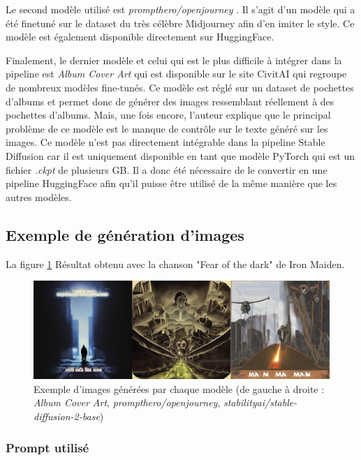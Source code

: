 Le second modèle utilisé est \textit{prompthero/openjourney} \cite{prompthero/openjourney}. 
Il s'agit d'un modèle qui a été finetuné sur le dataset du très célèbre Midjourney \cite{midjourney} afin d'en imiter le style.
Ce modèle est également disponible directement sur HuggingFace.

Finalement, le dernier modèle et celui qui est le plus difficile à intégrer dans la pipeline est
\textit{Album Cover Art} qui est disponible sur le site CivitAI \cite{civit-ai} qui regroupe de nombreux modèles fine-tunés.
Ce modèle est réglé sur un dataset de pochettes d'albums et permet donc de générer des images ressemblant réellement à des pochettes d'albums. Mais, une fois encore, l'auteur explique que le principal problème de ce modèle est le manque de contrôle sur le texte généré sur les images. Ce modèle n'est pas directement intégrable dans la pipeline Stable Diffusion car il est uniquement disponible en tant que modèle PyTorch qui est un fichier \textit{.ckpt} de plusieurs GB. Il a donc été nécessaire de le convertir en une pipeline HuggingFace afin qu'il puisse être utilisé de la même manière que les autres modèles.

\subsection{Exemple de génération d'images}
La figure \ref{fig:generation_result} Résultat obtenu avec la chanson "Fear of the dark" de Iron Maiden.

\begin{figure}[H]
    \centering
    \includegraphics[width=1\textwidth]{rsc/results_art_generation.jpeg}
    \caption[Exemple d'images générées par chaque modèle]{Exemple d'images générées par chaque modèle (de gauche à droite : \textit{Album Cover Art}, \textit{prompthero/openjourney}, \textit{stabilityai/stable-diffusion-2-base})}
    \label{fig:generation_result}
\end{figure}

\subsubsection*{Prompt utilisé}

